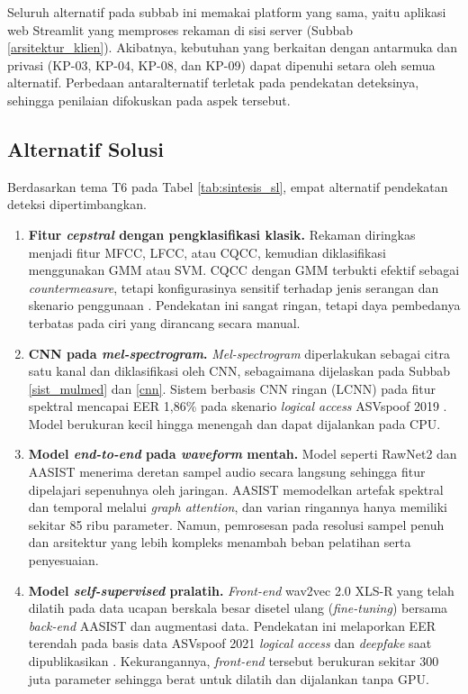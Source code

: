 Seluruh alternatif pada subbab ini memakai platform yang sama, yaitu aplikasi web Streamlit yang memproses rekaman di sisi server (Subbab \ref{arsitektur_klien}). Akibatnya, kebutuhan yang berkaitan dengan antarmuka dan privasi (KP-03, KP-04, KP-08, dan KP-09) dapat dipenuhi setara oleh semua alternatif. Perbedaan antaralternatif terletak pada pendekatan deteksinya, sehingga penilaian difokuskan pada aspek tersebut.

\subsection{Alternatif Solusi}
\label{daftar_alternatif}

Berdasarkan tema T6 pada Tabel \ref{tab:sintesis_sl}, empat alternatif pendekatan deteksi dipertimbangkan.

\begin{enumerate}[(A1).]
  \item \textbf{Fitur \textit{cepstral} dengan pengklasifikasi klasik.} Rekaman diringkas menjadi fitur MFCC, LFCC, atau CQCC, kemudian diklasifikasi menggunakan GMM atau SVM. CQCC dengan GMM terbukti efektif sebagai \textit{countermeasure}, tetapi konfigurasinya sensitif terhadap jenis serangan dan skenario penggunaan \autocite{todisco2017cqcc}. Pendekatan ini sangat ringan, tetapi daya pembedanya terbatas pada ciri yang dirancang secara manual.
  \item \textbf{CNN pada \textit{mel-spectrogram}.} \textit{Mel-spectrogram} diperlakukan sebagai citra satu kanal dan diklasifikasi oleh CNN, sebagaimana dijelaskan pada Subbab \ref{sist_mulmed} dan \ref{cnn}. Sistem berbasis CNN ringan (LCNN) pada fitur spektral mencapai EER 1,86\% pada skenario \textit{logical access} ASVspoof 2019 \autocite{lavrentyeva2019stc}. Model berukuran kecil hingga menengah dan dapat dijalankan pada CPU.
  \item \textbf{Model \textit{end-to-end} pada \textit{waveform} mentah.} Model seperti RawNet2 \autocite{tak2021rawnet2} dan AASIST \autocite{jung2022aasist} menerima deretan sampel audio secara langsung sehingga fitur dipelajari sepenuhnya oleh jaringan. AASIST memodelkan artefak spektral dan temporal melalui \textit{graph attention}, dan varian ringannya hanya memiliki sekitar 85 ribu parameter. Namun, pemrosesan pada resolusi sampel penuh dan arsitektur yang lebih kompleks menambah beban pelatihan serta penyesuaian.
  \item \textbf{Model \textit{self-supervised} pralatih.} \textit{Front-end} wav2vec 2.0 XLS-R yang telah dilatih pada data ucapan berskala besar disetel ulang (\textit{fine-tuning}) bersama \textit{back-end} AASIST dan augmentasi data. Pendekatan ini melaporkan EER terendah pada basis data ASVspoof 2021 \textit{logical access} dan \textit{deepfake} saat dipublikasikan \autocite{tak2022wav2vec}. Kekurangannya, \textit{front-end} tersebut berukuran sekitar 300 juta parameter sehingga berat untuk dilatih dan dijalankan tanpa GPU.
\end{enumerate}

